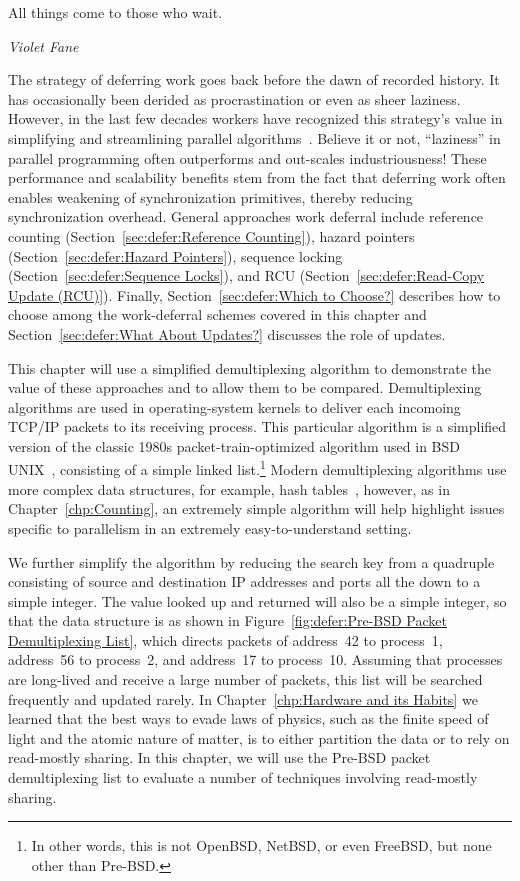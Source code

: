 

\epigraph{All things come to those who wait.}{\emph{Violet Fane}}

The strategy of deferring work goes back before the dawn of recorded
history. It has occasionally been derided as procrastination or
even as sheer laziness.
However, in the last few decades workers have recognized this strategy's value
in simplifying and streamlining parallel algorithms~\cite{Kung80,HMassalinPhD}.
Believe it or not, ``laziness'' in parallel programming often outperforms and
out-scales industriousness!
These performance and scalability benefits stem from the fact that
deferring work often enables weakening of synchronization primitives,
thereby reducing synchronization overhead.
General approaches work deferral include
reference counting (Section~\ref{sec:defer:Reference Counting}),
hazard pointers (Section~\ref{sec:defer:Hazard Pointers}),
sequence locking (Section~\ref{sec:defer:Sequence Locks}),
and RCU (Section~\ref{sec:defer:Read-Copy Update (RCU)}).
Finally, Section~\ref{sec:defer:Which to Choose?}
describes how to choose among the work-deferral schemes covered in
this chapter and Section~\ref{sec:defer:What About Updates?}
discusses the role of updates.

This chapter will use a simplified demultiplexing algorithm to demonstrate
the value of these approaches and to allow them to be compared.
Demultiplexing algorithms are used in operating-system kernels to
deliver each incomoing TCP/IP packets to its receiving process.
This particular algorithm is a simplified version of the classic 1980s
packet-train-optimized algorithm used in BSD UNIX~\cite{VanJacobson88},
consisting of a simple linked list.\footnote{
	In other words, this is not OpenBSD, NetBSD, or even
	FreeBSD, but none other than Pre-BSD.}
Modern demultiplexing algorithms use more complex data structures,
for example, hash tables~\cite{McKenney92b}, however, as in
Chapter~\ref{chp:Counting}, an extremely simple algorithm will
help highlight issues specific to parallelism in an extremely
easy-to-understand setting.

We further simplify the algorithm by reducing the search key from
a quadruple consisting of source and destination IP addresses and
ports all the down to a simple integer.
The value looked up and returned will also be a simple integer,
so that the data structure is as shown in
Figure~\ref{fig:defer:Pre-BSD Packet Demultiplexing List}, which
directs packets of address~42 to process~1, address~56 to
process~2, and address~17 to process~10.
Assuming that processes are long-lived and receive a large number
of packets, this list will be searched frequently and updated
rarely.
In Chapter~\ref{chp:Hardware and its Habits}
we learned that the best ways to evade laws of physics, such as
the finite speed of light and the atomic nature of matter, is to
either partition the data or to rely on read-mostly sharing.
In this chapter, we will use the Pre-BSD packet demultiplexing
list to evaluate a number of techniques involving read-mostly
sharing.

